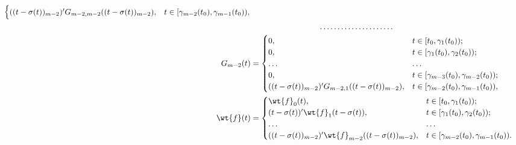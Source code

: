 \begin{align*}
\begin{cases}
((t-\sigma(t))_{m-2})'G_{m-2,m-2}((t-\sigma(t))_{m-2}),&


t \in [\gamma_{m-2} (t_0), \gamma_{m-1} (t_0)),


\end{cases}


\\


%


& \hspace{3cm}\dotsc\dotsc\dotsc\dotsc\dotsc\dotsc\dotsc \\


%


G_{m-2}(t) &=


\begin{cases}


0, & t \in [t_0, \gamma_1(t_0));\\


0, & t \in [\gamma_1(t_0),\gamma_2(t_0));\\


\dotsc & \dotsc \\


0, & t \in [\gamma_{m-3} (t_0), \gamma_{m-2} (t_0));\\


((t-\sigma(t))_{m-2})'G_{m-2,1}((t-\sigma(t))_{m-2}),&


t \in [\gamma_{m-2} (t_0), \gamma_{m-1} (t_0)),


\end{cases}


\\


%


\wt{f}(t) &=


\begin{cases}


\wt{f}_0(t),& t \in [t_0, \gamma_1(t_0));\\


(t-\sigma(t))'\wt{f}_1(t- \sigma (t)),&


t \in [\gamma_1(t_0),\gamma_2(t_0));\\


\dotsc & \dotsc \\


((t-\sigma(t))_{m-2})'\wt{f}_{m-2}((t-\sigma(t))_{m-2}),&


t \in [\gamma_{m-2} (t_0), \gamma_{m-1} (t_0)).


\end{cases}


\end{align*}





